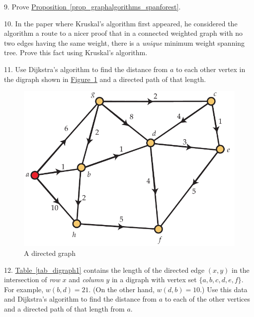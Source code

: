 \documentclass[10pt,]{book}
\theoremstyle{plain}
\theoremstyle{definition}
\theoremstyle{definition}
\theoremstyle{definition}
\theoremstyle{definition}
\numberwithin{equation}{section}
\begin{document}
\begin{exerciselist}
\item[9.]\hypertarget{exercise-21}{}\hypertarget{p-263}{}%
Prove \hyperref[prop_graphalgorithms_spanforest]{Proposition~\ref{prop_graphalgorithms_spanforest}}.%
\par\smallskip
\item[10.]\hypertarget{exercise-22}{}\hypertarget{p-264}{}%
In the paper where Kruskal's algorithm first appeared, he considered the algorithm a route to a nicer proof that in a connected weighted graph with no two edges having the same weight, there is a \emph{unique} minimum weight spanning tree. Prove this fact using Kruskal's algorithm.%
\par\smallskip
\item[11.]\hypertarget{exercise-23}{}\hypertarget{p-265}{}%
Use Dijkstra's algorithm to find the distance from \(a\) to each other vertex in the digraph shown in \hyperref[fig_graphalgorithms_dijkstra_ex1]{Figure~\ref{fig_graphalgorithms_dijkstra_ex1}} and a directed path of that length.%
\begin{figure}
\centering
\includegraphics[width=0.65\linewidth]{images/dijkstra_ex1}
\caption{A directed graph\label{fig_graphalgorithms_dijkstra_ex1}}
\end{figure}
\par\smallskip
\item[12.]\hypertarget{exercise-24}{}\hypertarget{p-266}{}%
\hyperref[tab_digraph1]{Table~\ref{tab_digraph1}} contains the length of the directed edge \((x,y)\) in the intersection of \emph{row} \(x\) and \emph{column} \(y\) in a digraph with vertex set \(\{a,b,c,d,e,f\}\). For example, \(w(b,d)=21\). (On the other hand, \(w(d,b)=10\).) Use this data and Dijkstra's algorithm to find the distance from \(a\) to each of the other vertices and a directed path of that length from \(a\).%
\begin{table}
\centering
\begin{tabular}{lAllllll}

\end{tabular}
\end{table}
\end{exerciselist}
\end{document}
